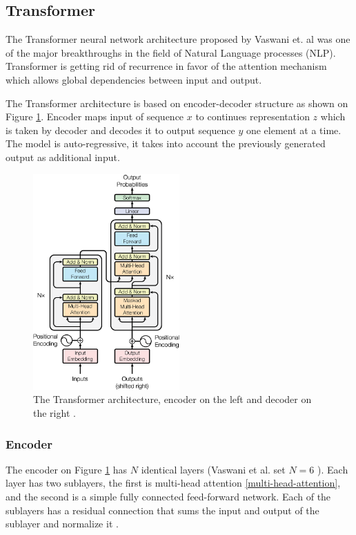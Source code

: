         \subsection{Transformer}\label{transformer}
        The Transformer neural network architecture proposed by Vaswani et. al \cite{attention-is-all} was one of the major breakthroughs in the field of Natural Language processes (NLP). Transformer is getting rid of recurrence \cite{lstm} in favor of the attention mechanism which allows global dependencies between input and output. 
        
        The Transformer architecture is based on encoder-decoder structure as shown on Figure \ref{fig:transformer}. Encoder maps input of sequence $x$ to continues representation $z$ which is taken by decoder and decodes it to output sequence $y$ one element at a time. The model is auto-regressive, it takes into account the previously generated output as additional input.
        
        \begin{figure}[ht]
            \centering
            \includegraphics[width=0.5\textwidth]{resources/theoretical-background/transformer-arch.jpeg}
            \caption{The Transformer architecture, encoder on the left and decoder on the right \cite{attention-is-all}.}
            \label{fig:transformer}
        \end{figure}
        
            \subsubsection{Encoder}
            The encoder on Figure \ref{fig:transformer} has $N$ identical layers (Vaswani et al. set $N=6$ \cite{attention-is-all}). Each layer has two sublayers, the first is multi-head attention \ref{multi-head-attention}, and the second is a simple fully connected feed-forward network. Each of the sublayers has a residual connection \cite{residual-connection} that sums the input and output of the sublayer and normalize it \cite{normalization}. 
            
